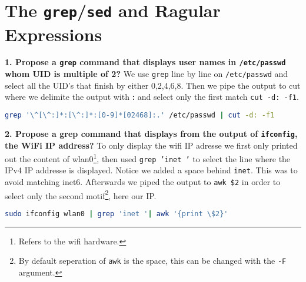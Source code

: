 \documentclass[a4paper,oneside,onecolumn]{article}
\newcommand{\code}[1]{\colorbox{codegray}{\texttt{#1}}}
\begin{document}
\section*{The \code{grep}/\code{sed} and Ragular Expressions}

\noindent 
\textbf{1. Propose a \code{grep} command that displays user names in \texttt{/etc/passwd}
whom UID is multiple of 2?}
\newline
\newline
We use \code{grep} line by line on \texttt{/etc/passwd} and select all the UID's that finish by either 0,2,4,6,8. Then we pipe the output to cut where we delimite the output with \textbf{:} and select only the first match \code{cut -d: -f1}.
\newline
\newline
\begin{lstlisting}[language=bash]
grep '\^[\^:]*:[\^:]*:[0-9]*[02468]:.' /etc/passwd | cut -d: -f1
\end{lstlisting}

\noindent
\textbf{2. Propose a grep command that displays from the output of \code{ifconfig}, the WiFi IP address?}
\newline
\newline
To only display the wifi IP adresse we first only printed out the content of wlan0\footnote{Refers to the wifi hardware.}, then used \code{grep 'inet '} to select the line where the IPv4 IP addresse is displayed. Notice we added a space behind \texttt{inet}. This was to avoid matching inet6. Afterwards we piped the output to \code{awk \$2} in order to select only the second motif\footnote{By default seperation of \code{awk} is the space, this can be changed with the \code{-F} argument.}, here our IP.
\newline
\newline
\begin{lstlisting}[language=bash]
sudo ifconfig wlan0 | grep 'inet '| awk '{print \$2}'
\end{lstlisting}
\noindent
\end{document}
